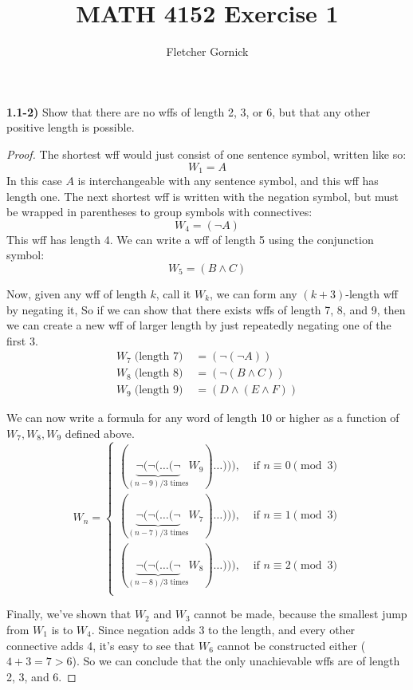 \documentclass[11pt]{article}
\begin{document}
\title{\vspace{-1cm}MATH 4152 Exercise 1}
  \author{Fletcher Gornick}
  \maketitle
  \textbf{1.1-2)} Show that there are no wffs of length 2, 3, or 6, but that any other positive length is possible.
  \begin{proof}
    The shortest wff would just consist of one sentence symbol, written like so:
    \[W_1 = A\]
    In this case \(A\) is interchangeable with any sentence symbol, and this wff has length one.  The next shortest wff is written with the negation symbol, but must be wrapped in parentheses to group symbols with connectives:
    \[W_4 = (\neg A)\]
    This wff has length 4.  We can write a wff of length 5 using the conjunction symbol:
    \[W_5 = (B \wedge C)\]

    Now, given any wff of length \(k\), call it \(W_k\), we can form any \((k+3)\)-length wff by negating it, So if we can show that there exists wffs of length 7, 8, and 9, then we can create a new wff of larger length by just repeatedly negating one of the first 3.
    \begin{align*}
      W_7 \; \text{(length 7)} \; &= (\neg (\neg A)) \\
      W_8 \; \text{(length 8)} \; &= (\neg (B \wedge C)) \\
      W_9 \; \text{(length 9)} \; &= (D \wedge (E \wedge F))
    \end{align*}

    We can now write a formula for any word of length 10 or higher as a function of \(W_7,W_8,W_9\) defined above.
    \[
      W_n  = \begin{cases}
        (\underbrace{\neg (\neg ( \hdots (\neg}_{(n-9)/3 \text{ times}} W_9) \hdots))), &\text{ if } n \equiv 0 \pmod 3 \\
        (\underbrace{\neg (\neg ( \hdots (\neg}_{(n-7)/3 \text{ times}} W_7) \hdots))), &\text{ if } n \equiv 1 \pmod 3 \\
        (\underbrace{\neg (\neg ( \hdots (\neg}_{(n-8)/3 \text{ times}} W_8) \hdots))), &\text{ if } n \equiv 2 \pmod 3 \\
      \end{cases}
    \]

    Finally, we've shown that \(W_2\) and \(W_3\) cannot be made, because the smallest jump from \(W_1\) is to \(W_4\).  Since negation adds 3 to the length, and every other connective adds 4, it's easy to see that \(W_6\) cannot be constructed either (\(4+3=7 > 6\)).  So we can conclude that the only unachievable wffs are of length 2, 3, and 6.
  \end{proof}
\end{document}
